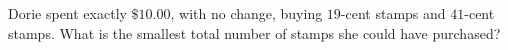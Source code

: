 Dorie spent exactly $\$10.00$, with no change, buying $19$-cent stamps and $41$-cent stamps. What is the smallest total number of stamps she could have purchased?
